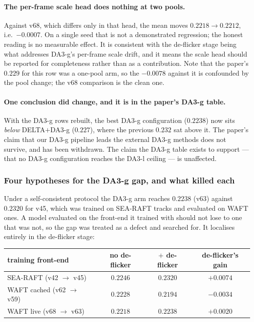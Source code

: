 \documentclass[11pt,a4paper]{article}
\begin{document}
\paragraph{The per-frame scale head does nothing at two pools.} Against v68, which differs only in
that head, the mean moves $0.2218 \to 0.2212$, i.e.\ $-0.0007$. On a single seed that is not a
demonstrated regression; the honest reading is no measurable effect. It is consistent with the
de-flicker stage being what addresses DA3-g's per-frame scale drift, and it means the scale head
should be reported for completeness rather than as a contribution. Note that the paper's $0.229$ for
this row was a one-pool arm, so the $-0.0078$ against it is confounded by the pool change; the v68
comparison is the clean one.

\paragraph{One conclusion did change, and it is in the paper's DA3-g table.} With the DA3-g rows
rebuilt, the best DA3-g configuration ($0.2238$) now sits \emph{below} DELTA$+$DA3-g ($0.227$),
where the previous $0.232$ sat above it. The paper's claim that our DA3-g pipeline leads the
external DA3-g methods does not survive, and has been withdrawn. The claim the DA3-g table exists to
support --- that no DA3-g configuration reaches the DA3-l ceiling --- is unaffected.

\subsubsection{Four hypotheses for the DA3-g gap, and what killed each}
\label{sec:deflicker-signal}

Under a self-consistent protocol the DA3-g arm reaches $0.2238$ (v63) against $0.2320$ for v45,
which was trained on SEA-RAFT tracks and evaluated on WAFT ones. A model evaluated on the front-end
it trained with should not lose to one that was not, so the gap was treated as a defect and
searched for. It localises entirely in the de-flicker stage:

\begin{center}\small
\begin{tabular}{lccc}
\toprule
training front-end & no de-flicker & $+$ de-flicker & de-flicker's gain \\
\midrule
SEA-RAFT (v42 $\to$ v45)      & $0.2246$ & $0.2320$ & $+0.0074$ \\
WAFT cached (v62 $\to$ v59)   & $0.2228$ & $0.2194$ & $-0.0034$ \\
WAFT live (v68 $\to$ v63)     & $0.2218$ & $0.2238$ & $+0.0020$ \\
\bottomrule
\end{tabular}
\end{center}
\end{document}
